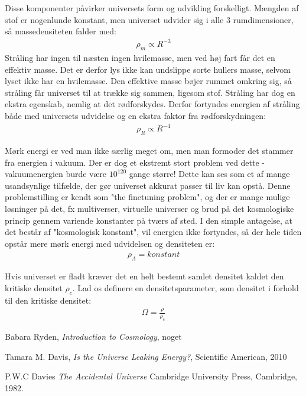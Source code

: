 \documentclass[a4paper]{article}
\begin{document}
Disse komponenter påvirker universets form og udvikling forskelligt. Mængden af stof er nogenlunde konstant, men universet udvider sig i alle 3 rumdimensioner, så massedensiteten falder med:
\begin{align}
	\rho_m \propto R^{-3}
\end{align}
Stråling har ingen til næsten ingen hvilemasse, men ved høj fart får det en effektiv masse. Det er derfor lys ikke kan undslippe sorte hullers masse, selvom lyset ikke har en hvilemasse. Den effektive masse bøjer rummet omkring sig, så stråling får universet til at trække sig sammen, ligesom stof. Stråling har dog en ekstra egenskab, nemlig at det rødforskydes. Derfor fortyndes energien af stråling både med universets udvidelse og en ekstra faktor fra rødforskydningen:
\begin{align}
	\rho_R\propto R^{-4}
\end{align}

Mørk energi er ved man ikke særlig meget om, men man formoder det stammer fra energien i vakuum. Der er dog et ekstremt stort problem ved dette - vakuumenergien burde være $10^{120}$ gange større! Dette kan ses som et af mange usandsynlige tilfælde, der gør universet akkurat passer til liv kan opstå. Denne problemstilling er kendt som "the finetuning problem", og der er mange mulige løsninger på det, fx multiverser, virtuelle universer og brud på det kosmologiske princip gennem variende konstanter på tværs af sted. %
I den simple antagelse, at det består af "kosmologisk konstant", vil energien ikke fortyndes, så der hele tiden opstår mere mørk energi med udvidelsen og densiteten er:
\begin{align}
	\rho_\Lambda = konstant
\end{align}

Hvis universet er fladt kræver det en helt bestemt samlet densitet kaldet den kritiske densitet $\rho_c$. Lad os definere en densitetsparameter, som densitet i forhold til den kritiske densitet:
\begin{align}
	\Omega=\frac{\rho}{\rho_c}
\end{align}


\begin{thebibliography}{9}
Babara Ryden,
\textit{Introduction to Cosmology},
noget

Tamara M. Davis,
\textit{Is the Universe Leaking Energy?},
Scientific American, 2010

P.W.C Davies
\textit{The Accidental Universe}
Cambridge University Press, Cambridge, 1982.

\end{thebibliography}
\end{document}
